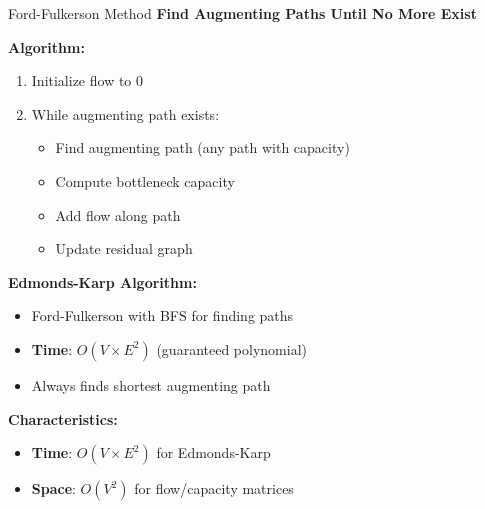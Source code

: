 \documentclass[aspectratio=169]{beamer}
\begin{document}
\begin{frame}{Ford-Fulkerson Method}
  \textbf{Find Augmenting Paths Until No More Exist}

  \vspace{0.3cm}
  \textbf{Algorithm:}
  \begin{enumerate}
    \item Initialize flow to 0
    \item While augmenting path exists:
    \begin{itemize}
      \item Find augmenting path (any path with capacity)
      \item Compute bottleneck capacity
      \item Add flow along path
      \item Update residual graph
    \end{itemize}
  \end{enumerate}

  \vspace{0.3cm}
  \textbf{Edmonds-Karp Algorithm:}
  \begin{itemize}
    \item Ford-Fulkerson with BFS for finding paths
    \item \textbf{Time}: $O(V \times E^2)$ (guaranteed polynomial)
    \item Always finds shortest augmenting path
  \end{itemize}

  \vspace{0.3cm}
  \textbf{Characteristics:}
  \begin{itemize}
    \item \textbf{Time}: $O(V \times E^2)$ for Edmonds-Karp
    \item \textbf{Space}: $O(V^2)$ for flow/capacity matrices
  \end{itemize}
\end{frame}
\end{document}
